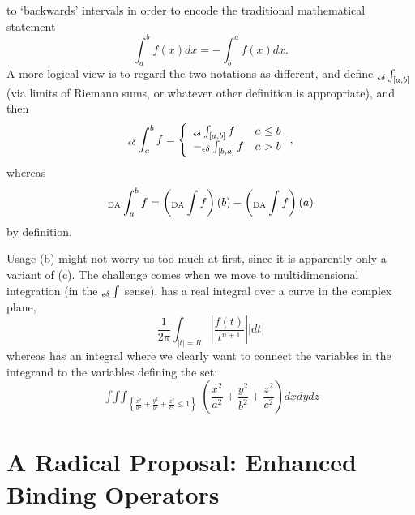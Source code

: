 \documentclass{llncs}
\begin{document}
to `backwards' intervals in order to encode the traditional mathematical statement
\begin{equation}\label{eq:backint}
\int_a^bf(x) dx=-\int_b^af(x) dx.
\end{equation}
A more logical view is to regard the two notations as different, and define
${}_{\epsilon\delta}\int_{[a,b]}$ (via limits of Riemann sums, or whatever other definition is
appropriate), and then
\begin{equation}\label{eq:backinted}
\Ied_a^bf=%
\left\{
\begin{array}{lr}
\Ied_{[a,b]}f & a\le b\\
-\Ied_{[b,a]}f & a>b\\
\end{array}\right.,
\end{equation}
whereas 
\begin{equation}\label{eq:backintda} 
{}_{\rm DA}\int_a^bf = \left({}_{\rm DA}\int f\right)(b)-\left({}_{\rm DA}\int f\right)(a)
\end{equation}
by definition.

Usage (b) might not worry us too much at first, since it is apparently only a variant of
(c). The challenge comes when we move to multidimensional integration (in the ${}_{\epsilon\delta}\int$
sense).  \cite[p. 189]{BorweinErdelyi1995} has a real integral over a curve in the complex
plane,
\begin{equation}\label{eq:bounds2} 
\frac1{2\pi}\int_{|t|=R}\left|\frac{f(t)}{t^{n+1}}\right| |dt|
\end{equation}
whereas \cite[p. 413, exercise 4, slightly recast]{Apostol1967} has an integral
where we clearly want to connect the variables in the integrand to the variables defining
the set:
\begin{equation}\label{eq:bounds1} 
\mathop{\int\int\int}_{\left\{\frac{x^2}{a^2}+\frac{y^2}{b^2}+\frac{z^2}{c^2}\le1\right\}}
\left(\frac{x^2}{a^2}+\frac{y^2}{b^2}+\frac{z^2}{c^2}\right)dxdydz
\end{equation}

\section{A Radical Proposal: Enhanced Binding Operators}\label{sec:proposal}
\end{document}
